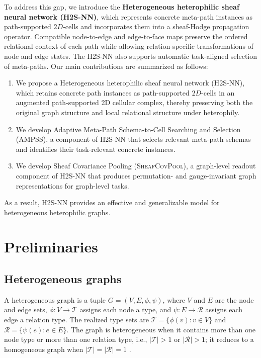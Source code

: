 \documentclass[sigconf,anonymous,review]{acmart}
\newcommand{\method}{\textsc{H2S-NN}}
\newcommand{\ampss}{\textsc{AMPSS}}
\newcommand{\sheafcovpool}{\textsc{SheafCovPool}}
\begin{document}
To address this gap, we introduce the \textbf{Heterogeneous heterophilic sheaf neural network (\method{})}, which represents concrete meta-path instances as path-supported \(2D\)-cells and incorporates them into a sheaf-Hodge propagation operator. Compatible node-to-edge and edge-to-face maps preserve the ordered relational context of each path while allowing relation-specific transformations of node and edge states. The \method{} also supports automatic task-aligned selection of meta-paths.
Our main contributions are summarized as follows:
\begin{enumerate}
  \item We propose a Heterogeneous heterophilic sheaf neural network (\method{}), which retains concrete path instances as path-supported \(2D\)-cells in an augmented path-supported 2D cellular complex, thereby preserving both the original graph structure and local relational structure under heterophily.
  \item We develop Adaptive Meta-Path Schema-to-Cell Searching and Selection (\ampss{}), a component of \method{} that selects relevant meta-path schemas and identifies their task-relevant concrete instances.

  \item We develop Sheaf Covariance Pooling (\sheafcovpool{}), a graph-level readout component of \method{} that produces permutation- and gauge-invariant graph representations for graph-level tasks.
\end{enumerate}

As a result, \method{} provides an effective and generalizable model for heterogeneous heterophilic graphs.

\section{Preliminaries}
\label{sec:background}


\subsection{Heterogeneous graphs}

A heterogeneous graph is a tuple $G=(V,E,\phi,\psi)$, where $V$ and $E$ are the node and edge
sets, $\phi:V\rightarrow\mathcal{T}$ assigns each node a type, and
$\psi:E\rightarrow\mathcal{R}$ assigns each edge a relation type. The realized type sets are
$\mathcal{T}=\{\phi(v):v\in V\}$ and $\mathcal{R}=\{\psi(e):e\in E\}$. The graph is heterogeneous
when it contains more than one node type or more than one relation type, i.e.,
$|\mathcal{T}|>1$ or $|\mathcal{R}|>1$; it reduces to a homogeneous graph when
$|\mathcal{T}|=|\mathcal{R}|=1$ \cite{lu2026addressing}.
\end{document}
